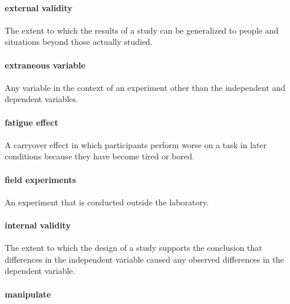 \documentclass[
]{krantz}
\begin{document}
\paragraph*{external validity}\label{external-validity-1}

The extent to which the results of a study can be generalized to people and situations beyond those actually studied.

\paragraph*{extraneous variable}\label{extraneous-variable}

Any variable in the context of an experiment other than the independent and dependent variables.

\paragraph*{fatigue effect}\label{fatigue-effect}

A carryover effect in which participants perform worse on a task in later conditions because they have become tired or bored.

\paragraph*{field experiments}\label{field-experiments}

An experiment that is conducted outside the laboratory.

\paragraph*{internal validity}\label{internal-validity-1}

The extent to which the design of a study supports the conclusion that differences in the independent variable caused any observed differences in the dependent variable.

\paragraph*{manipulate}\label{manipulate}
\end{document}
